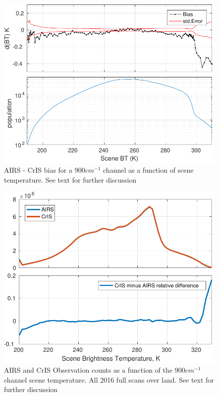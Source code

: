 \documentclass[twocolumn,10pt]{article}
\begin{document}
\begin{figure}[htb]
\centering
\includegraphics[width=\linewidth]{./figs/AC_jplSNO_900wn_bias_vs_scene.pdf}
\caption{\label{fig:orgparagraph18}
  AIRS - CrIS bias for a $900 cm^{-1}$ channel as a function of scene temperature. See text for further discussion}
\label{fig:Y6}
\end{figure}

\begin{figure}[htb]
\centering
\includegraphics[width=\linewidth]{./figs/full_scan_land_2016_all_mod.pdf}
\caption{\label{fig:orgparagraph18}
  AIRS and CrIS Observation counts as a function of the $900 cm^{-1}$ channel scene temperature. All 2016 full scans over land. See text for further discussion}
\label{fig:Y7}
\end{figure}
\end{document}
